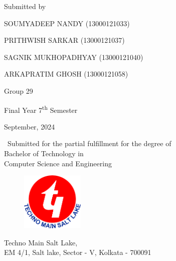 \thispagestyle{empty}
\begin{center}
    { \Large {\bfseries {\mytitle}} \par}
\vspace{2\baselineskip}
    {
    \large{Submitted by} 
    
    \vspace{2\baselineskip}

\vspace{\baselineskip}

    {SOUMYADEEP NANDY (13000121033)}
    
    \vspace{\baselineskip}

   {PRITHWISH SARKAR (13000121037)}
  \vspace{\baselineskip}

     {SAGNIK MUKHOPADHYAY (13000121040)}
    \vspace{\baselineskip}

    {ARKAPRATIM GHOSH (13000121058)}

\vspace{1\baselineskip}
\vspace{1\baselineskip}
    \large{ \textlangle{} Group 29 \textrangle{}}}
    
 \vspace{1\baselineskip}   
    \large{Final Year 7\textsuperscript{th} Semester \par}   
\vspace{\baselineskip}
    \large{ \textlangle{} September, 2024 \textrangle{}}
    
\vspace{\baselineskip}
    {\ {Submitted for the partial fulfillment for the degree of \\Bachelor of Technology in \\Computer Science and Engineering }\par}
\vspace{1\baselineskip}
    {\begin{figure}[!h] 
	\centering
	\includegraphics[width=30mm]{./Images/tmsl.png} 
     \end{figure}
    }
\vspace{1.5\baselineskip}

    { {Techno Main Salt Lake,\\
                    EM 4/1, Salt lake, Sector - V, Kolkata - 700091} \par}
 \end{center}